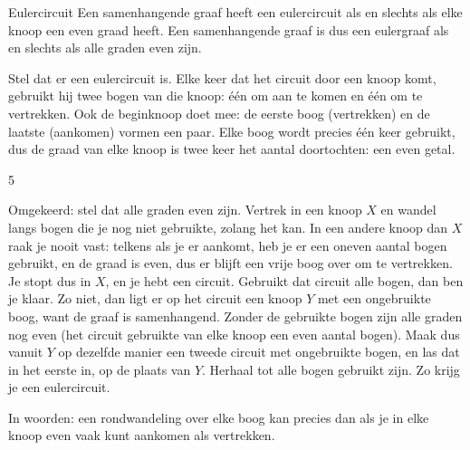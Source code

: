 \begin{theorie}
\begin{stelling}{Eulercircuit}
Een samenhangende graaf heeft een eulercircuit als en slechts als elke knoop een even graad heeft. Een samenhangende graaf is dus een eulergraaf als en slechts als alle graden even zijn.
\end{stelling}
\begin{bewijs}
Stel dat er een eulercircuit is. Elke keer dat het circuit door een knoop komt, gebruikt hij twee bogen van die knoop: één om aan te komen en één om te vertrekken. Ook de beginknoop doet mee: de eerste boog (vertrekken) en de laatste (aankomen) vormen een paar. Elke boog wordt precies één keer gebruikt, dus de graad van elke knoop is twee keer het aantal doortochten: een even getal.
\end{bewijs}
\begin{alleenvoor}{5}
\begin{bewijs}
Omgekeerd: stel dat alle graden even zijn. Vertrek in een knoop $X$ en wandel langs bogen die je nog niet gebruikte, zolang het kan. In een andere knoop dan $X$ raak je nooit vast: telkens als je er aankomt, heb je er een oneven aantal bogen gebruikt, en de graad is even, dus er blijft een vrije boog over om te vertrekken. Je stopt dus in $X$, en je hebt een circuit. Gebruikt dat circuit alle bogen, dan ben je klaar. Zo niet, dan ligt er op het circuit een knoop $Y$ met een ongebruikte boog, want de graaf is samenhangend. Zonder de gebruikte bogen zijn alle graden nog even (het circuit gebruikte van elke knoop een even aantal bogen). Maak dus vanuit $Y$ op dezelfde manier een tweede circuit met ongebruikte bogen, en las dat in het eerste in, op de plaats van $Y$. Herhaal tot alle bogen gebruikt zijn. Zo krijg je een eulercircuit.
\end{bewijs}
\end{alleenvoor}
\end{theorie}

In woorden: een rondwandeling over elke boog kan precies dan als je in elke knoop even vaak kunt aankomen als vertrekken.

